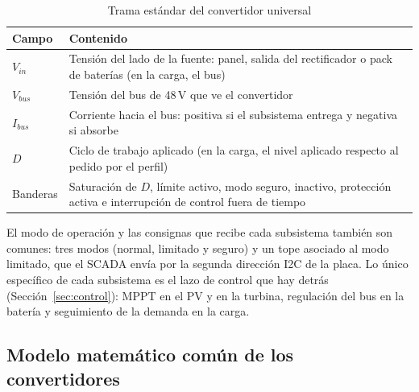 \documentclass[conference]{IEEEtran}
\begin{document}
\begin{table}[H]
\caption{Trama estándar del convertidor universal}
\label{tab:trama_convertidor}
\centering
\scriptsize
\begin{tabular}{|l|p{5.4cm}|}
\hline
\textbf{Campo} & \textbf{Contenido} \\
\hline
$V_{in}$ & Tensión del lado de la fuente: panel, salida del rectificador o pack de baterías (en la carga, el bus) \\
\hline
$V_{bus}$ & Tensión del bus de 48\,V que ve el convertidor \\
\hline
$I_{bus}$ & Corriente hacia el bus: positiva si el subsistema entrega y negativa si absorbe \\
\hline
$D$ & Ciclo de trabajo aplicado (en la carga, el nivel aplicado respecto al pedido por el perfil) \\
\hline
Banderas & Saturación de $D$, límite activo, modo seguro, inactivo, protección activa e interrupción de control fuera de tiempo \\
\hline
\end{tabular}
\end{table}

El modo de operación y las consignas que recibe cada subsistema también son comunes: tres modos (normal, limitado y seguro) y un tope asociado al modo limitado, que el SCADA envía por la segunda dirección I2C de la placa. Lo único específico de cada subsistema es el lazo de control que hay detrás (Sección~\ref{sec:control}): MPPT en el PV y en la turbina, regulación del bus en la batería y seguimiento de la demanda en la carga.

\subsection{Modelo matemático común de los convertidores}
\label{sec:modelo_convertidores}
\end{document}
